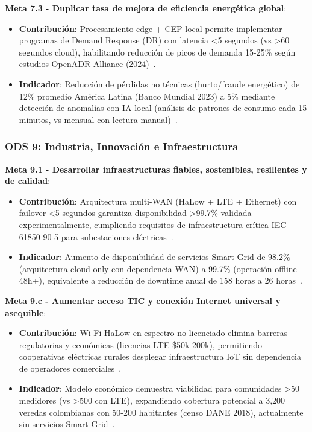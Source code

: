 \textbf{Meta 7.3 - Duplicar tasa de mejora de eficiencia energética global}:
\begin{itemize}
    \item \textbf{Contribución}: Procesamiento edge + CEP local permite implementar programas de Demand Response (DR) con latencia <5 segundos (vs >60 segundos cloud), habilitando reducción de picos de demanda 15-25\% según estudios OpenADR Alliance (2024)~\cite{miglaniDeepLearningModels2022,perezImplicationSoftwareContainerization2024}.
    \item \textbf{Indicador}: Reducción de pérdidas no técnicas (hurto/fraude energético) de 12\% promedio América Latina (Banco Mundial 2023) a 5\% mediante detección de anomalías con IA local (análisis de patrones de consumo cada 15 minutos, vs mensual con lectura manual)~\cite{ayaUnleashingIntelligenceEdge2024,huangDataProcessingEnhancement2025}.
\end{itemize}

\subsubsection{ODS 9: Industria, Innovación e Infraestructura}

\textbf{Meta 9.1 - Desarrollar infraestructuras fiables, sostenibles, resilientes y de calidad}:
\begin{itemize}
    \item \textbf{Contribución}: Arquitectura multi-WAN (HaLow + LTE + Ethernet) con failover <5 segundos garantiza disponibilidad >99.7\% validada experimentalmente, cumpliendo requisitos de infraestructura crítica IEC 61850-90-5 para subestaciones eléctricas~\cite{rehmanCriticalInfrastructuresResilience2024,zhangEnablingFaultTolerant2024}.
    \item \textbf{Indicador}: Aumento de disponibilidad de servicios Smart Grid de 98.2\% (arquitectura cloud-only con dependencia WAN) a 99.7\% (operación offline 48h+), equivalente a reducción de downtime anual de 158 horas a 26 horas~\cite{kumariEdgeComputingData2024,pereraScalableDataanalyticCapable2024}.
\end{itemize}

\textbf{Meta 9.c - Aumentar acceso TIC y conexión Internet universal y asequible}:
\begin{itemize}
    \item \textbf{Contribución}: Wi-Fi HaLow en espectro no licenciado elimina barreras regulatorias y económicas (licencias LTE \$50k-200k), permitiendo cooperativas eléctricas rurales desplegar infraestructura IoT sin dependencia de operadores comerciales~\cite{scharerPushingWiFiHaLow2025,tianWiFiHaLowInternet2021,faizankhanHybridWiFiHaLow2024}.
    \item \textbf{Indicador}: Modelo económico demuestra viabilidad para comunidades >50 medidores (vs >500 con LTE), expandiendo cobertura potencial a 3,200 veredas colombianas con 50-200 habitantes (censo DANE 2018), actualmente sin servicios Smart Grid~\cite{amrilPerformanceEvaluationWiFi2025,rizanovWiFiHaLowWildfire2024}.
\end{itemize}

